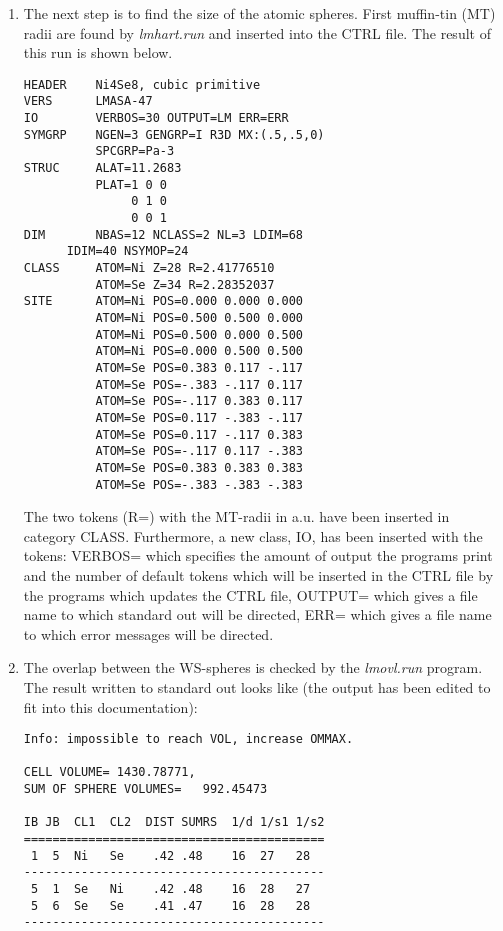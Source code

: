 \documentclass[aps,twocolumn,a4]{revtex4}
\begin{document}
\begin{enumerate}
\item The next step is to find the size of the atomic spheres.
First muffin-tin (MT) radii are found by {\em lmhart.run} and inserted
into the CTRL file. The result of this run is shown below.
\begin{verbatim}
HEADER    Ni4Se8, cubic primitive
VERS      LMASA-47
IO        VERBOS=30 OUTPUT=LM ERR=ERR
SYMGRP    NGEN=3 GENGRP=I R3D MX:(.5,.5,0)
          SPCGRP=Pa-3
STRUC     ALAT=11.2683
          PLAT=1 0 0
               0 1 0
               0 0 1
DIM       NBAS=12 NCLASS=2 NL=3 LDIM=68
	  IDIM=40 NSYMOP=24
CLASS     ATOM=Ni Z=28 R=2.41776510
          ATOM=Se Z=34 R=2.28352037
SITE      ATOM=Ni POS=0.000 0.000 0.000
          ATOM=Ni POS=0.500 0.500 0.000
          ATOM=Ni POS=0.500 0.000 0.500
          ATOM=Ni POS=0.000 0.500 0.500
          ATOM=Se POS=0.383 0.117 -.117
          ATOM=Se POS=-.383 -.117 0.117
          ATOM=Se POS=-.117 0.383 0.117
          ATOM=Se POS=0.117 -.383 -.117
          ATOM=Se POS=0.117 -.117 0.383
          ATOM=Se POS=-.117 0.117 -.383
          ATOM=Se POS=0.383 0.383 0.383
          ATOM=Se POS=-.383 -.383 -.383
\end{verbatim}

The two tokens (R=) with the MT-radii in a.u. have been
inserted in category CLASS. Furthermore, a new class, IO, has been
inserted with the tokens: VERBOS= which specifies the amount of
output the programs print and the number of default tokens which will
be inserted in the CTRL file by the programs which updates the CTRL
file, OUTPUT= which gives a file name to which standard out will be
directed, ERR= which gives a file name to which error messages will
be directed.

\item The overlap between the WS-spheres is checked by the
{\em lmovl.run} program. 
The result written to standard out
looks like (the output has been edited to fit into this
documentation):
\begin{verbatim}
Info: impossible to reach VOL, increase OMMAX.

CELL VOLUME= 1430.78771,
SUM OF SPHERE VOLUMES=   992.45473

IB JB  CL1  CL2  DIST SUMRS  1/d 1/s1 1/s2
==========================================
 1  5  Ni   Se    .42 .48    16  27   28
------------------------------------------
 5  1  Se   Ni    .42 .48    16  28   27
 5  6  Se   Se    .41 .47    16  28   28
------------------------------------------

\end{verbatim}


\end{enumerate}
\end{document}
